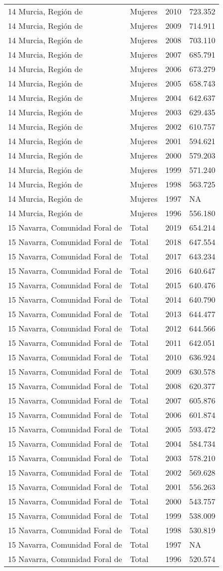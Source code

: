 \documentclass[
]{article}
\begin{document}
\begin{longtable}[]{@{}llrl@{}}
14 Murcia, Región de & Mujeres & 2010 & 723.352\tabularnewline
14 Murcia, Región de & Mujeres & 2009 & 714.911\tabularnewline
14 Murcia, Región de & Mujeres & 2008 & 703.110\tabularnewline
14 Murcia, Región de & Mujeres & 2007 & 685.791\tabularnewline
14 Murcia, Región de & Mujeres & 2006 & 673.279\tabularnewline
14 Murcia, Región de & Mujeres & 2005 & 658.743\tabularnewline
14 Murcia, Región de & Mujeres & 2004 & 642.637\tabularnewline
14 Murcia, Región de & Mujeres & 2003 & 629.435\tabularnewline
14 Murcia, Región de & Mujeres & 2002 & 610.757\tabularnewline
14 Murcia, Región de & Mujeres & 2001 & 594.621\tabularnewline
14 Murcia, Región de & Mujeres & 2000 & 579.203\tabularnewline
14 Murcia, Región de & Mujeres & 1999 & 571.240\tabularnewline
14 Murcia, Región de & Mujeres & 1998 & 563.725\tabularnewline
14 Murcia, Región de & Mujeres & 1997 & NA\tabularnewline
14 Murcia, Región de & Mujeres & 1996 & 556.180\tabularnewline
15 Navarra, Comunidad Foral de & Total & 2019 & 654.214\tabularnewline
15 Navarra, Comunidad Foral de & Total & 2018 & 647.554\tabularnewline
15 Navarra, Comunidad Foral de & Total & 2017 & 643.234\tabularnewline
15 Navarra, Comunidad Foral de & Total & 2016 & 640.647\tabularnewline
15 Navarra, Comunidad Foral de & Total & 2015 & 640.476\tabularnewline
15 Navarra, Comunidad Foral de & Total & 2014 & 640.790\tabularnewline
15 Navarra, Comunidad Foral de & Total & 2013 & 644.477\tabularnewline
15 Navarra, Comunidad Foral de & Total & 2012 & 644.566\tabularnewline
15 Navarra, Comunidad Foral de & Total & 2011 & 642.051\tabularnewline
15 Navarra, Comunidad Foral de & Total & 2010 & 636.924\tabularnewline
15 Navarra, Comunidad Foral de & Total & 2009 & 630.578\tabularnewline
15 Navarra, Comunidad Foral de & Total & 2008 & 620.377\tabularnewline
15 Navarra, Comunidad Foral de & Total & 2007 & 605.876\tabularnewline
15 Navarra, Comunidad Foral de & Total & 2006 & 601.874\tabularnewline
15 Navarra, Comunidad Foral de & Total & 2005 & 593.472\tabularnewline
15 Navarra, Comunidad Foral de & Total & 2004 & 584.734\tabularnewline
15 Navarra, Comunidad Foral de & Total & 2003 & 578.210\tabularnewline
15 Navarra, Comunidad Foral de & Total & 2002 & 569.628\tabularnewline
15 Navarra, Comunidad Foral de & Total & 2001 & 556.263\tabularnewline
15 Navarra, Comunidad Foral de & Total & 2000 & 543.757\tabularnewline
15 Navarra, Comunidad Foral de & Total & 1999 & 538.009\tabularnewline
15 Navarra, Comunidad Foral de & Total & 1998 & 530.819\tabularnewline
15 Navarra, Comunidad Foral de & Total & 1997 & NA\tabularnewline
15 Navarra, Comunidad Foral de & Total & 1996 & 520.574\tabularnewline

\end{longtable}
\end{document}
